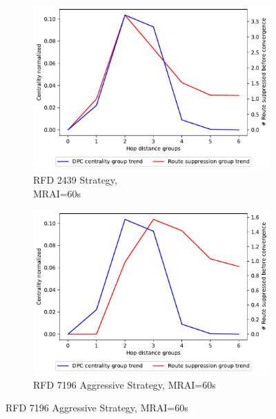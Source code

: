 \begin{figure}[H]
\begin{subfigure}[b]{0.325\textwidth}
     \end{subfigure}
     \vfill
     \begin{subfigure}[b]{0.325\textwidth}
         \centering
         \includegraphics[width=\textwidth]{images/RFD/miceVSelephants/MultiMRAI/60/mice/cisco_1000_RFD_nodeConvergence_centVSsup_trend.pdf}
         \caption{RFD 2439 Strategy, \\MRAI=60s}
         \label{fig:1000_2439RFD_centVSsup_mices}
     \end{subfigure}
     \hfill
     \begin{subfigure}[b]{0.325\textwidth}
         \centering
         \includegraphics[width=\textwidth]{images/RFD/miceVSelephants/MultiMRAI/60/mice/cisco_1000_RFD_7196_aggressive_nodeConvergence_centVSsup_trend.pdf}
         \caption{RFD 7196 Aggressive Strategy, MRAI=60s}
         \label{fig:1000_7196RFDA_centVSsup_mices}

\end{subfigure}
\end{figure}
